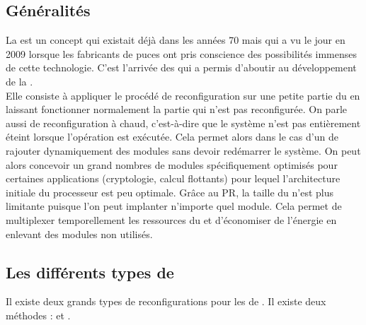 
\subsection{Généralités}

La  est un concept qui existait déjà dans les années 70 mais qui a vu le jour en 2009 lorsque les fabricants de puces \fpgas ont pris conscience des possibilités immenses de cette technologie. C'est l'arrivée des \fpgas{} qui a permis d'aboutir au développement de la .\\
Elle consiste à appliquer le procédé de reconfiguration sur une petite partie du \fpga{} en laissant fonctionner normalement la partie qui n'est pas reconfigurée. On parle aussi de reconfiguration à chaud, c'est-à-dire que le système n'est pas entièrement éteint lorsque l'opération est exécutée. Cela permet alors dans le cas d'un  de rajouter dynamiquement des modules sans devoir redémarrer le système. On peut alors concevoir un grand nombres de modules spécifiquement optimisés pour certaines applications (cryptologie, calcul flottants) pour lequel l'architecture initiale du processeur est peu optimale. Grâce au PR, la taille du \fpga{} n'est plus limitante puisque l'on peut implanter n'importe quel module. Cela permet de multiplexer temporellement les ressources du \fpga{} et d'économiser de l'énergie en enlevant des modules non utilisés.

\subsection{Les différents types de }

Il existe deux grands types de reconfigurations pour les \fpgas{} de . Il existe deux méthodes :  et .\\

